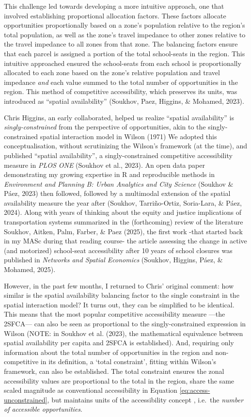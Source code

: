 \documentclass[
11pt, %
oneside, %
english, %
singlespacing, %
]{macthesis} %
\begin{document}
This challenge led towards developing a more intuitive approach, one that involved establishing proportional allocation factors. These factors allocate opportunities proportionally based on a zone's population relative to the region's total population, as well as the zone's travel impedance to other zones relative to the travel impedance to all zones from that zone. The balancing factors ensure that each parcel is assigned a portion of the total school-seats in the region. This intuitive approached ensured the school-seats from each school is proportionally allocated to each zone based on the zone's relative population and travel impedance \emph{and} each value summed to the total number of opportunities in the region. This method of competitive accessibility, which preserves its units, was introduced as ``spatial availability'' (Soukhov, Paez, Higgins, \& Mohamed, 2023).

Chris Higgins, an early collaborated, helped us realize ``spatial availability'' is \emph{singly-constrained} from the perspective of opportunities, akin to the singly-constrained spatial interaction model in Wilson (1971) We adopted this conceptualisation, without scrutinizing the Wilson's framework (at the time), and published ``spatial availability'', a singly-constrained competitive accessibility measure in \emph{PLOS ONE} (Soukhov et al., 2023). An open data paper demonstrating my growing expertise in R and reproducible methods in \emph{Environment and Planning B: Urban Analytics and City Science} (Soukhov \& Páez, 2023) then followed, followed by a multimodal extension of the spatial availability measure the year after (Soukhov, Tarriño-Ortiz, Soria-Lara, \& Páez, 2024). Along with years of thinking about the equity and justice implications of transportation systems summarized in the (forthcoming) review of the literature Soukhov, Aitken, Palm, Farber, \& Paez (2025), the first work -that started back in my MASc during that reading course- the article assessing the change in active (and motorized) school-seat accessibility after 10 years of school closures was published in \emph{Networks and Spatial Economics} (Soukhov, Higgins, Páez, \& Mohamed, 2025).

However, in the past few months, I returned to Chris' original comment: how similar is the spatial availability balancing factor to the single constraint in the spatial interaction model? It turns out, they can be simplified to be identical. This means that the most popular competitive accessibility measure ---the 2SFCA--- can also be seen as proportional to the singly-constrained expression in Wilson (NOTE: in Soukhov et al. (2023), the mathematical equivalence between spatial availability per capita and 2SFCA is established). And, requiring only information about the total number of opportunities in the region and non-competitive in its definition, a `total constraint', fitting within Wilson's framework, can also be established. The total constraint ensures the zonal accessibility values are proportional to the total in the region, share the same scaled magnitude as conventional accessibility in Equation \ref{eq:access-unconstrained}, but maintains units of the accessibility concept , i.e.~the \emph{number of accessible opportunities}.
\end{document}

